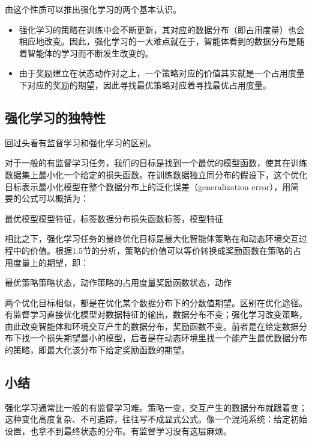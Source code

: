 由这个性质可以推出强化学习的两个基本认识。

\begin{itemize}
  \item 强化学习的策略在训练中会不断更新，其对应的数据分布（即占用度量）也会相应地改变。因此，强化学习的一大难点就在于，智能体看到的数据分布是随着智能体的学习而不断发生改变的。
  \item 由于奖励建立在状态动作对之上，\colorbox{mdc1}{一个策略对应的价值其实就是一个占用度量下对应的奖励的期望}，因此寻找最优策略对应着寻找最优占用度量。
\end{itemize}

\subsection{强化学习的独特性}

回过头看有监督学习和强化学习的区别。

对于一般的有监督学习任务，我们的目标是找到一个最优的模型函数，使其在训练数据集上最小化一个给定的损失函数。在训练数据独立同分布的假设下，这个优化目标表示最小化模型在整个数据分布上的泛化误差（generalization error），用简要的公式可以概括为：

最优模型模型特征，标签数据分布损失函数标签，模型特征

相比之下，强化学习任务的最终优化目标是最大化智能体策略在和动态环境交互过程中的价值。根据1.5节的分析，策略的价值可以等价转换成奖励函数在策略的占用度量上的期望，即：

最优策略策略状态，动作策略的占用度量奖励函数状态，动作

两个优化目标相似，都是在优化某个数据分布下的分数值期望。区别在优化途径。有监督学习直接优化模型对数据特征的输出，数据分布不变；强化学习改变策略，由此改变智能体和环境交互产生的数据分布，奖励函数不变。前者是在给定数据分布下找一个损失期望最小的模型，后者是在动态环境里找一个能产生最优数据分布的策略，即最大化该分布下给定奖励函数的期望。

\subsection{小结}

强化学习通常比一般的有监督学习难。策略一变，交互产生的数据分布就跟着变；这种变化高度复杂、不可追踪，往往写不成显式公式。像一个混沌系统：给定初始设置，也拿不到最终状态的分布。有监督学习没有这层麻烦。
